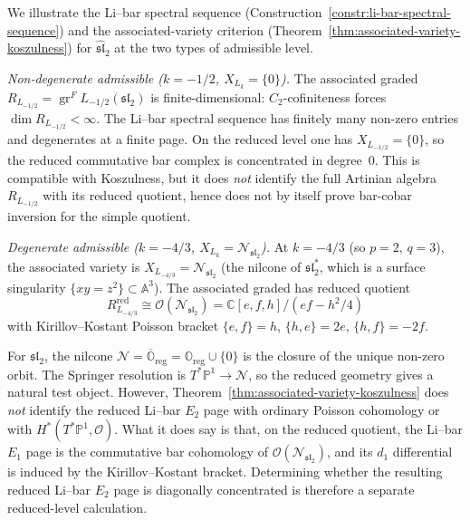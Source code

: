 \begin{example}
\label{ex:sl2-li-bar}
We illustrate the Li--bar spectral sequence
(Construction~\ref{constr:li-bar-spectral-sequence}) and the
associated-variety criterion
(Theorem~\ref{thm:associated-variety-koszulness}) for
$\widehat{\mathfrak{sl}}_2$ at the two types of admissible level.

\emph{Non-degenerate admissible
\textup{(}$k = -1/2$, $X_{L_k} = \{0\}$\textup{)}.}
The associated graded
$R_{L_{-1/2}} = \operatorname{gr}^F L_{-1/2}(\mathfrak{sl}_2)$
is finite-dimensional: $C_2$-cofiniteness forces
$\dim R_{L_{-1/2}} < \infty$. The Li--bar spectral sequence
has finitely many non-zero entries and degenerates at a finite
page. On the reduced level one has
$X_{L_{-1/2}} = \{0\}$, so the reduced commutative bar complex is
concentrated in degree~$0$. This is compatible with Koszulness,
but it does \emph{not} identify the full Artinian algebra
$R_{L_{-1/2}}$ with its reduced quotient, hence does not by
itself prove bar-cobar inversion for the simple quotient.

\emph{Degenerate admissible
\textup{(}$k = -4/3$, $X_{L_k} = \mathcal{N}_{\mathfrak{sl}_2}$\textup{)}.}
At $k = -4/3$ (so $p = 2$, $q = 3$), the associated variety is
$X_{L_{-4/3}} = \mathcal{N}_{\mathfrak{sl}_2}$
(the nilcone of $\mathfrak{sl}_2^*$, which is a surface
singularity $\{xy = z^2\} \subset \mathbb{A}^3$). The associated
graded has reduced quotient
\[
R_{L_{-4/3}}^{\mathrm{red}}
\cong \mathcal{O}(\mathcal{N}_{\mathfrak{sl}_2})
= \mathbb{C}[e, f, h]/(ef - h^2/4)
\]
with Kirillov--Kostant Poisson bracket
$\{e, f\} = h$, $\{h, e\} = 2e$, $\{h, f\} = -2f$.

For $\mathfrak{sl}_2$, the nilcone
$\mathcal{N} = \overline{\mathbb{O}}_{\mathrm{reg}} = \mathbb{O}_{\mathrm{reg}} \cup \{0\}$
is the closure of the unique non-zero orbit. The Springer
resolution is $T^*\mathbb{P}^1 \to \mathcal{N}$, so the reduced
geometry gives a natural test object. However,
Theorem~\ref{thm:associated-variety-koszulness} does
\emph{not} identify the reduced Li--bar $E_2$ page with ordinary
Poisson cohomology or with
$H^*(T^*\mathbb{P}^1,\mathcal{O})$. What it does say is that,
on the reduced quotient, the Li--bar $E_1$ page is the
commutative bar cohomology of
$\mathcal{O}(\mathcal{N}_{\mathfrak{sl}_2})$, and its $d_1$
differential is induced by the Kirillov--Kostant bracket.
Determining whether the resulting reduced Li--bar $E_2$ page is
diagonally concentrated is therefore a separate reduced-level
calculation.


\end{example}
